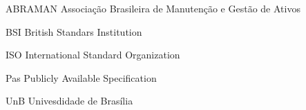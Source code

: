 \begin{siglas}
  \item[ABRAMAN] Associação Brasileira de Manutenção e Gestão de Ativos
  \item[BSI] British Standars Institution
  \item[ISO] International Standard Organization
  \item[Pas] Publicly Available Specification
  \item[UnB] Univesdidade de Brasília
\end{siglas}
